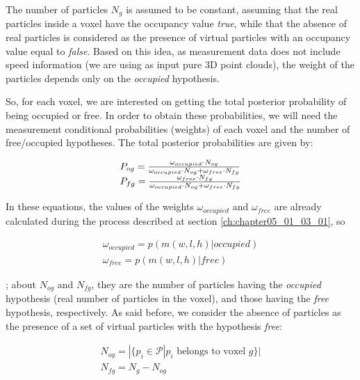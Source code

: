 The number of particles $N_g$ is assumed to be constant, assuming that the real particles inside a voxel have the occupancy value \emph{true}, while that the absence of real particles is considered as the presence of virtual particles with an occupancy value equal to \emph{false}. Based on this idea, as measurement data does not include speed information (we are using as input pure 3D point clouds), the weight of the particles depends only on the \emph{occupied} hypothesis.

So, for each voxel, we are interested on getting the total posterior probability of being occupied or free. In order to obtain these probabilities, we will need the measurement conditional probabilities (weights) of each voxel and the number of free/occupied hypotheses. The total posterior probabilities are given by:

\begin{equation}\label{eq:cp05_total_posterior_probabilities}
\begin{array}{l}
P_{og}={{\omega_{occupied} \cdot N_{og}} \over {\omega_{occupied} \cdot N_{og} + \omega_{free} \cdot N_{fg}}} \\
P_{fg}={{\omega_{free} \cdot N_{fg}} \over {\omega_{occupied} \cdot N_{og} + \omega_{free} \cdot N_{fg}}}
\end{array}
\end{equation}

In these equations, the values of the weights $\omega_{occupied}$ and $\omega_{free}$ are already calculated during the process described at section \ref{ch:chapter05_01_03_01}, so 

\begin{equation}\label{eq:cp05_occupancy_weights}
\begin{array}{l}
\omega_{occupied} = p(m(w,l,h)|occupied) \\
\omega_{free} = p(m(w,l,h)|free)
\end{array}
\end{equation}

; about $N_{og}$ and $N_{fg}$, they are the number of particles having the \emph{occupied} hypothesis (real number of particles in the voxel), and those having the \emph{free} hypothesis, respectively. As said before, we consider the absence of particles as the presence of a set of virtual particles with the hypothesis \emph{free}:

\begin{equation}\label{eq:cp05_number_of_particles}
\begin{array}{l}
N_{og} = | \{ p_i \in \mathcal{P} | p_i \text{ belongs to voxel } g \} | \\
N_{fg} = N_g - N_{og}
\end{array}
\end{equation}

